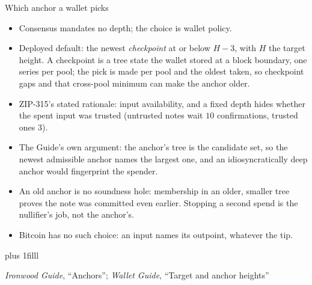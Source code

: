 \documentclass[aspectratio=169,11pt]{beamer}
\newcommand{\src}[1]{\par\vskip0pt plus 1filll
  {\fontsize{6}{7.2}\selectfont\color{arbdim}\raggedright #1\par}}
\begin{document}
\begin{frame}{Which anchor a wallet picks}
\begin{itemize}
  \item Consensus mandates no depth; the choice is wallet policy.
  \item Deployed default: the newest \emph{checkpoint} at or below
    $H - 3$, with $H$ the target height. A checkpoint is a tree state
    the wallet stored at a block boundary, one series per pool; the
    pick is made per pool and the oldest taken, so checkpoint gaps and
    that cross-pool minimum can make the anchor older.
  \item ZIP-315's stated rationale: input availability, and a fixed
    depth hides whether the spent input was trusted (untrusted notes
    wait $10$ confirmations, trusted ones $3$).
  \item The Guide's own argument: the anchor's tree is the candidate
    set, so the newest admissible anchor names the largest one, and an
    idiosyncratically deep anchor would fingerprint the spender.
  \item An old anchor is no soundness hole: membership in an older,
    smaller tree proves the note was committed even earlier. Stopping
    a second spend is the nullifier's job, not the anchor's.
  \item Bitcoin has no such choice: an input names its outpoint,
    whatever the tip.
\end{itemize}
\src{\emph{Ironwood Guide}, ``Anchors''; \emph{Wallet Guide}, ``Target and
  anchor heights''}
\end{frame}
\end{document}
